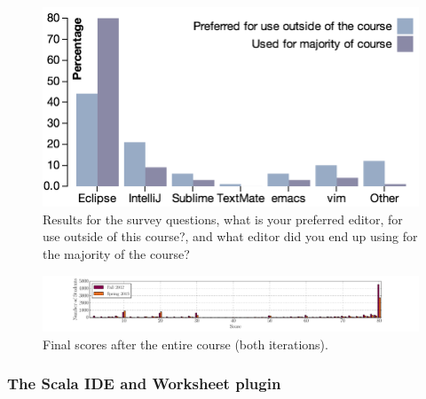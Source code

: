 \documentclass{sig-alternate}
\begin{document}
\begin{figure}[ht!]
  \centering
  \includegraphics[width=\columnwidth]{plots/ides.png}
  \caption{Results for the survey questions, what is your preferred editor, for use outside of this course?, and what editor did you end up using for the majority of the course?}
  \label{fig:ides}
\end{figure}

\begin{figure}[htb!]
  \centering
  \includegraphics[width=\textwidth]{plots/final-scores.pdf}
  \vspace{-0.8cm}
  \caption{Final scores after the entire course (both iterations).}
  \label{fig:final-scores}
\end{figure}




\subsubsection{The Scala IDE and Worksheet plugin}
\end{document}
